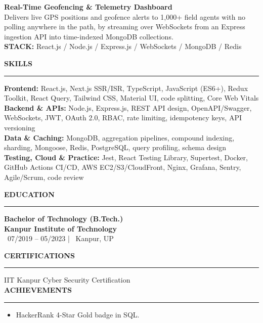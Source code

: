 \documentclass[10pt]{article}
\newcommand{\resumesection}[1]{%
  \vspace{6pt}%
  {\fontfamily{phv}\selectfont\textbf{\large\MakeUppercase{#1}}}%
  \vspace{2pt}%
  \hrule%
  \vspace{4pt}%
}
\begin{document}
\vspace{4pt}
{\textbf{Real-Time Geofencing \& Telemetry Dashboard}} \\
{\small Delivers live GPS positions and geofence alerts to 1,000+ field agents with no polling anywhere in the path, by streaming over WebSockets from an Express ingestion API into time-indexed MongoDB collections.} \\
{\footnotesize\textbf{STACK:} React.js / Node.js / Express.js / WebSockets / MongoDB / Redis}

\resumesection{Skills}
\textbf{Frontend:} React.js, Next.js SSR/ISR, TypeScript, JavaScript (ES6+), Redux Toolkit, React Query, Tailwind CSS, Material UI, code splitting, Core Web Vitals \\
\textbf{Backend \& APIs:} Node.js, Express.js, REST API design, OpenAPI/Swagger, WebSockets, JWT, OAuth 2.0, RBAC, rate limiting, idempotency keys, API versioning \\
\textbf{Data \& Caching:} MongoDB, aggregation pipelines, compound indexing, sharding, Mongoose, Redis, PostgreSQL, query profiling, schema design \\
\textbf{Testing, Cloud \& Practice:} Jest, React Testing Library, Supertest, Docker, GitHub Actions CI/CD, AWS EC2/S3/CloudFront, Nginx, Grafana, Sentry, Agile/Scrum, code review

\resumesection{Education}
{\textbf{Bachelor of Technology (B.Tech.)}} \\
{\textbf{\textcolor{primaryblue}{Kanpur Institute of Technology}}} \\
{\footnotesize\textcolor{primaryblue}{\faCalendar*}~07/2019 -- 05/2023 \quad | \quad \textcolor{primaryblue}{\faMapMarker*}~Kanpur, UP}

\resumesection{Certifications}
IIT Kanpur Cyber Security Certification \\


\resumesection{Achievements}
\begin{itemize}
    \item HackerRank 4-Star Gold badge in SQL.
\end{itemize}
\end{document}

